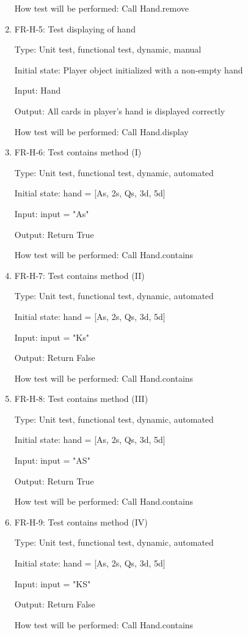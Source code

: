 \documentclass[12pt, titlepage]{article}
\begin{document}
\begin{enumerate}
    How test will be performed: Call Hand.remove
    
    \item{FR-H-5: Test displaying of hand\\}
    
    Type: Unit test, functional test, dynamic, manual 
    					
    Initial state: Player object initialized with a non-empty hand
    
    Input: Hand
    
    Output: All cards in player's hand is displayed correctly
    
    How test will be performed: Call Hand.display
    
    \item{FR-H-6: Test contains method (I)\\}
    
    Type: Unit test, functional test, dynamic, automated
    
    Initial state: hand = [As, 2s, Qs, 3d, 5d]
    
    Input: input = "As"
    
    Output: Return True
    
    How test will be performed: Call Hand.contains
    
    \item{FR-H-7: Test contains method (II)\\}
    
    Type: Unit test, functional test, dynamic, automated
    
    Initial state: hand = [As, 2s, Qs, 3d, 5d]
    
    Input: input = "Ks"
    
    Output: Return False
    
    How test will be performed: Call Hand.contains
    
    \item{FR-H-8: Test contains method (III)\\}
    
    Type: Unit test, functional test, dynamic, automated
    
    Initial state: hand = [As, 2s, Qs, 3d, 5d]
    
    Input: input = "AS"
    
    Output: Return True
    
    How test will be performed: Call Hand.contains
    
    \item{FR-H-9: Test contains method (IV)\\}
    
    Type: Unit test, functional test, dynamic, automated
    
    Initial state: hand = [As, 2s, Qs, 3d, 5d]
    
    Input: input = "KS"
    
    Output: Return False
    
    How test will be performed: Call Hand.contains
\end{enumerate}
\end{document}
